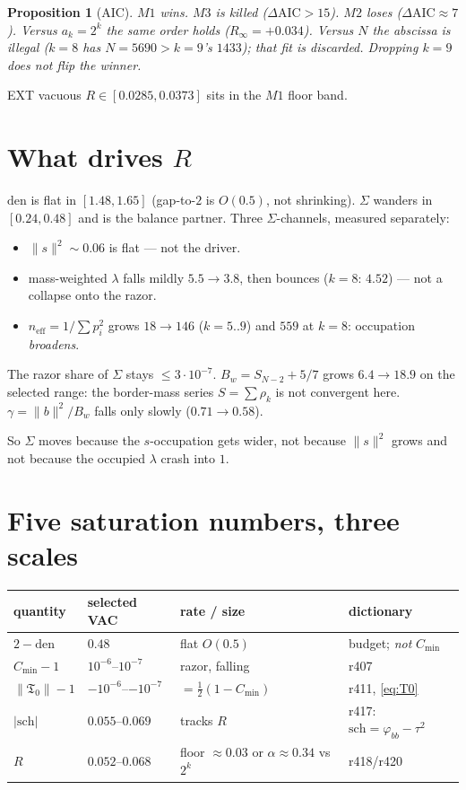 \documentclass[11pt]{article}
\newtheorem{prop}{Proposition}
\theoremstyle{remark}
\newcommand{\phibb}{\varphi_{bb}}
\newcommand{\Tfrak}{\mathfrak{T}}
\begin{document}
\begin{prop}[AIC]\label{prop:aic}
$M1$ wins.
$M3$ is killed ($\Delta\mathrm{AIC}>15$).
$M2$ loses ($\Delta\mathrm{AIC}\approx 7$).
Versus $a_k=2^k$ the same order holds
($R_\infty=+0.034$).
Versus $N$ the abscissa is illegal
($k=8$ has $N=5690>k=9$'s $1433$);
that fit is discarded.
Dropping $k=9$ does not flip the winner.
\end{prop}

EXT vacuous $R\in[0.0285,0.0373]$ sits in the
$M1$ floor band.

\section{What drives $R$}\label{sec:drv}

$\mathrm{den}$ is flat in $[1.48,1.65]$
(gap-to-$2$ is $O(0.5)$, not shrinking).
$\Sigma$ wanders in $[0.24,0.48]$ and is the
balance partner.
Three $\Sigma$-channels, measured separately:

\begin{itemize}
\item $\|s\|^2\sim 0.06$ is flat --- not the driver.
\item mass-weighted $\lambda$ falls mildly
$5.5\to 3.8$, then bounces ($k=8$: $4.52$)
--- not a collapse onto the razor.
\item $n_{\mathrm{eff}}=1/\sum p_i^2$ grows
$18\to 146$ ($k=5..9$) and $559$ at $k=8$:
occupation \emph{broadens}.
\end{itemize}

The razor share of $\Sigma$ stays $\le 3\cdot 10^{-7}$.
$B_w=S_{N-2}+5/7$ grows $6.4\to 18.9$ on the
selected range: the border-mass series $S=\sum\rho_k$
is not convergent here.
$\gamma=\|b\|^2/B_w$ falls only slowly ($0.71\to 0.58$).

So $\Sigma$ moves because the $s$-occupation gets
wider, not because $\|s\|^2$ grows and not because
the occupied $\lambda$ crash into $1$.

\section{Five saturation numbers, three scales}\label{sec:sat}

\begin{center}
\begin{tabular}{llll}
\toprule
quantity & selected VAC & rate / size & dictionary \\
\midrule
$2-\mathrm{den}$ & $0.48$ & flat $O(0.5)$ & budget; \emph{not} $C_{\min}$ \\
$C_{\min}-1$ & $10^{-6}$--$10^{-7}$ & razor, falling & r407 \\
$\|\Tfrak_0\|-1$ & $-10^{-6}$--$-10^{-7}$ & $=\tfrac12(1-C_{\min})$ & r411, \eqref{eq:T0} \\
$|\mathrm{sch}|$ & $0.055$--$0.069$ & tracks $R$ & r417: $\mathrm{sch}=\phibb-\tau^2$ \\
$R$ & $0.052$--$0.068$ & floor $\approx 0.03$ or $\alpha\approx 0.34$ vs $2^k$ & r418/r420 \\
\bottomrule
\end{tabular}
\end{center}
\end{document}
